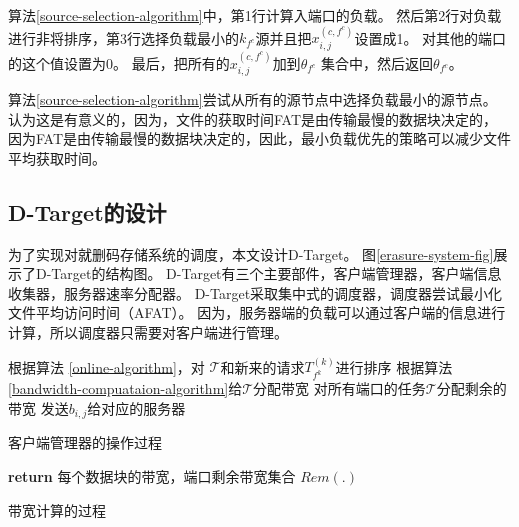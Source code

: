 算法\ref{source-selection-algorithm}中，第1行计算入端口的负载。
然后第2行对负载进行非将排序，第3行选择负载最小的$k_{f^c}$源并且把$x_{i,j}^{(c,f^c)}$设置成1。
对其他的端口的这个值设置为0。
最后，把所有的$x_{i,j}^{(c,f^c)}$加到$\theta_{f^c}$ 集合中，然后返回$\theta_{f^c}$。

算法\ref{source-selection-algorithm}尝试从所有的源节点中选择负载最小的源节点。
认为这是有意义的，因为，文件的获取时间FAT是由传输最慢的数据块决定的，
因为FAT是由传输最慢的数据块决定的，因此，最小负载优先的策略可以减少文件平均获取时间。 


\subsection{D-Target的设计}
为了实现对就删码存储系统的调度，本文设计D-Target。
图\ref{erasure-system-fig}展示了D-Target的结构图。
D-Target有三个主要部件，客户端管理器，客户端信息收集器，服务器速率分配器。
D-Target采取集中式的调度器，调度器尝试最小化文件平均访问时间（AFAT）。
因为，服务器端的负载可以通过客户端的信息进行计算，所以调度器只需要对客户端进行管理。


\begin{algorithm}
根据算法 \ref{online-algorithm}，对 $\mathcal{T}$和新来的请求$T^{(k)}_{f^k}$进行排序\;
根据算法 \ref{bandwidth-compuataion-algorithm}给$\mathcal{T}$分配带宽\;
对所有端口的任务$\mathcal{T}$分配剩余的带宽\;
发送$b_{i,j}$给对应的服务器\;
\caption{客户端管理器的操作过程}
\label{scheduler}
\end{algorithm}


\begin{algorithm}
\textbf{return} 每个数据块的带宽，端口剩余带宽集合 $Rem(.)$ 
\caption{带宽计算的过程}
\label{bandwidth-compuataion-algorithm}
\end{algorithm}

